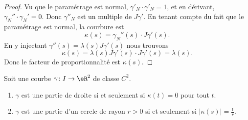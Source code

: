 \begin{proof}
	Vu que le paramétrage est normal, \( \gamma'_N\cdot \gamma'_N=1\), et en dérivant, \( \gamma_N''\cdot\gamma_N'=0\). Donc \( \gamma''_N\) est un multiple de \( J\gamma'\). En tenant compte du fait que le paramétrage est normal, la courbure est
	\begin{equation}
		\kappa(s)=\gamma_N''(s)\cdot J\gamma'(s).
	\end{equation}
	En y injectant \( \gamma''(s)=\lambda(s)J\gamma'(s)\) nous trouvons
	\begin{equation}
		\kappa(s)=\lambda(s)J\gamma'(s)\cdot J\gamma'(s)=\lambda(s).
	\end{equation}
	Donc le facteur de proportionnalité est \( \kappa(s)\).
\end{proof}

\begin{theorem}     \label{THOooDLDVooFQnLWn}
	Soit une courbe \( \gamma\colon I\to \eR^2\) de classe \( C^2\).
	\begin{enumerate}
		\item
		      \( \gamma\) est une partie de droite si et seulement si \( \kappa(t)=0\) pour tout \( t\).
		\item
		      \( \gamma\) est une partie d'un cercle de rayon \( r>0\) si et seulement si \( | \kappa(s) |=\frac{1}{ r }\).
	\end{enumerate}
\end{theorem}

